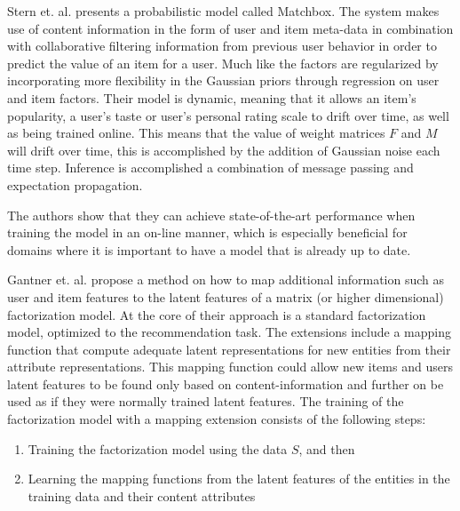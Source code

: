 
Stern et. al. \cite{Stern2009} presents a probabilistic model called Matchbox. The system makes use of content information in the form of user and
item meta-data in combination with collaborative filtering information from previous user behavior in order to predict the value of an item for a user. Much like \cite{Agarwal2009} the factors are regularized by incorporating more flexibility in the Gaussian priors through regression on user and item factors. Their model is dynamic, meaning that it allows an item's popularity, a user's taste or user's personal rating scale to drift over time, as well as being trained online. This means that the value of weight matrices $F$ and $M$ will drift over time, this is accomplished by the addition of Gaussian noise each time step. Inference is accomplished a combination of message passing and expectation propagation.

The authors show that they can achieve state-of-the-art performance when training the model in an on-line manner, which is especially beneficial for domains where it is important to have a model that is already up to date.


Gantner et. al. \cite{Gantner2010} propose a method on how to map additional
information such as user and item features to the latent features of a matrix
(or higher dimensional) factorization model. At the core of their approach is a
standard factorization model, optimized to the recommendation task. The
extensions include a mapping function that compute adequate latent
representations for new entities from their attribute representations. This
mapping function could allow new items and users latent features to be found
only based on content-information and further on be used as if they were
normally trained latent features. The training of the factorization model with
a mapping extension consists of the following steps:

\begin{enumerate}
\item Training the factorization model using the data $S$, and then
\item Learning the mapping functions from the latent features of the entities in the training data and their content attributes
\end{enumerate}

